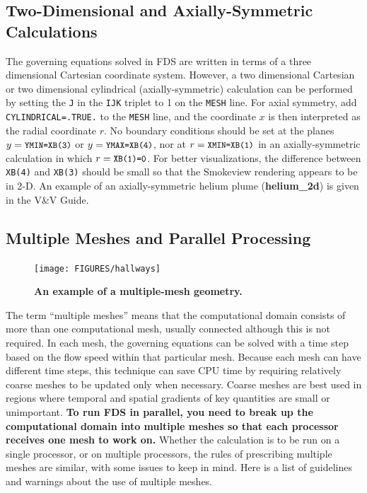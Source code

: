 \documentclass[11pt]{book}
\newcommand{\ct}{\tt\small}
\begin{document}
\subsection{Two-Dimensional and Axially-Symmetric Calculations}
\label{info:2D}  

The governing equations solved in FDS are written in terms of a
three dimensional Cartesian coordinate system. However,
a two dimensional Cartesian or two dimensional cylindrical
(axially-symmetric) calculation can be performed by setting the {\ct J} in the {\ct IJK} triplet
to 1 on the {\ct MESH} line. For axial symmetry, add {\ct CYLINDRICAL=.TRUE.} to the
{\ct MESH} line, and the coordinate $x$ is then interpreted as the radial coordinate $r$.
No boundary conditions should be set at the planes $y=\hbox{\ct YMIN=XB(3)}$ or
$y=\hbox{\ct YMAX=XB(4)}$, nor at $r=\hbox{\ct XMIN=XB(1)}$ in an axially-symmetric
calculation in which $r=\hbox{\ct XB(1)=0}$. For better visualizations, the difference between
{\ct XB(4)} and {\ct XB(3)} should be small so that the Smokeview rendering appears to be in 2-D.
An example of an axially-symmetric helium plume ({\bf helium\_2d}) is given in the V\&V Guide.


\subsection{Multiple Meshes and Parallel Processing}
\label{info:multimesh}

\begin{figure}[ht!]
\texttt{[image: FIGURES/hallways]}
\caption{\bf An example of a multiple-mesh geometry.}
\label{fig:domain}
\end{figure}

The term ``multiple meshes'' means that the computational domain consists of
more than one computational mesh, usually connected although this is not
required. In each mesh, the governing equations can be solved with a time
step based on the flow speed within that particular mesh. Because each
mesh can have different time steps, this technique can save CPU time by
requiring relatively coarse meshes to be updated only when necessary.
Coarse meshes are best used in regions where temporal and spatial gradients of key
quantities are small or unimportant.
{\bf To run FDS in parallel, you need to break up the computational domain into
multiple meshes so that each processor receives one mesh to work on.} Whether
the calculation is to be run on a single processor, or on multiple processors,
the rules of prescribing multiple meshes are similar, with some issues to keep in mind.
Here is a list of guidelines and warnings about the use of multiple meshes.
\end{document}
